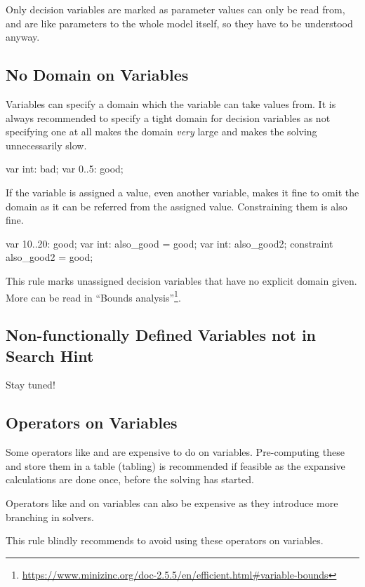 \documentclass[a4paper,12pt]{article}
\newcommand{\mi}[1]{\mbox{\mzninline{#1}}}
\begin{document}
Only decision variables are marked as parameter values can only be read from, and are like
parameters to the whole model itself, so they have to be understood anyway.

\subsection{No Domain on Variables}\label{sec:rule:nodomain}
Variables can specify a domain which the variable can take values from. It is always
recommended to specify a tight domain for decision variables as not specifying one at all
makes the domain \emph{very} large and makes the solving unnecessarily slow.
\begin{mznnobreak}
var int: bad;
var 0..5: good;
\end{mznnobreak}
If the variable is assigned a value, even another variable, makes it fine to omit the domain
as it can be referred from the assigned value. Constraining them is also fine.
\begin{mznnobreak}
var 10..20: good;
var int: also_good = good;
var int: also_good2;
constraint also_good2 = good;
\end{mznnobreak}
This rule marks unassigned decision variables that have no explicit domain given.
More can be read in ``Bounds analysis''\footnote{\url{https://www.minizinc.org/doc-2.5.5/en/efficient.html\#variable-bounds}}.

\subsection{Non-functionally Defined Variables not in Search Hint}\label{sec:rule:nonfuncdef}
Stay tuned!

\subsection{Operators on Variables}\label{sec:rule:opvar}
Some operators like \mi{div} and \mi{pow} are expensive to do on variables. Pre-computing
these and store them in a table (tabling) is recommended if feasible as the expansive calculations are
done once, before the solving has started.

Operators like \mi{\\/} and \mi{->} on variables can also be expensive as they introduce
more branching in solvers. %

This rule blindly recommends to avoid using these operators on variables.
\end{document}
